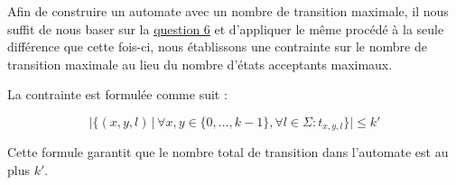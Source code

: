 
Afin de construire un automate avec un nombre de transition maximale, il nous suffit de nous baser sur la \hyperref[question 6]{question 6} et d'appliquer le même procédé à la seule différence que cette fois-ci, nous établissons une contrainte sur le nombre de transition maximale au lieu du nombre d'états acceptants maximaux.
\vspace{0.5cm}


\begin{tcolorbox}[defaultstyle,title=Contrainte de Cardinalité des Transitions]
La contrainte est formulée comme suit :

\[ \big\lvert \{ (x, y, l) \, \vert \, \forall x, y \in \{0,\dots,k-1\}, \forall l \in \Sigma : t_{x,y,l} \} \big\rvert \leq k' \]

Cette formule garantit que le nombre total de transition dans l'automate est au plus \( k' \).

\end{tcolorbox}

